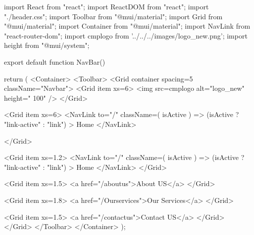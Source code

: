import React from "react";
import { ReactDOM } from "react";
import "./header.css";
import { Toolbar } from "@mui/material";
import { Grid } from "@mui/material";
import { Container } from "@mui/material";
import { NavLink } from "react-router-dom";
import cmplogo from '../../../images/logo_new.png';
import { height } from "@mui/system";

export default function NavBar() {
  return (
    <Container>
      <Toolbar>
        <Grid container spacing={5} className="Navbar">
          <Grid item xs={6}>
            <img src={cmplogo}  alt="logo_new" height=" 100"   />
          </Grid>

          <Grid item xs={6}>
          <NavLink
              to="/"
              className={({ isActive }) => (isActive ? "link-active" : "link")}
            >
              Home
            </NavLink>

          </Grid>

          <Grid item xs={1.2}>
          <NavLink
              to="/"
              className={({ isActive }) => (isActive ? "link-active" : "link")}
            >
              Home
            </NavLink>
          </Grid>

          <Grid item xs={1.5}>
            <a href="/aboutus">About US</a>
          </Grid>

          <Grid item xs={1.8}>
            <a href="/Ourservices">Our Services</a>
          </Grid>

          <Grid item xs={1.5}>
            <a href="/contactus">Contact US</a>
          </Grid>
        </Grid>
      </Toolbar>
    </Container>
  );
}
